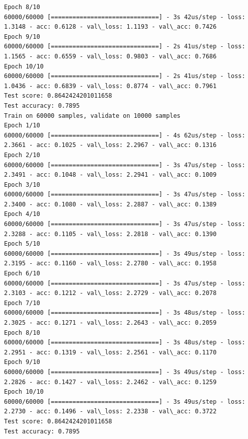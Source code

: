 \documentclass[11pt]{article}
\begin{document}
\begin{Verbatim}[commandchars=\\\{\}]
Epoch 8/10
60000/60000 [==============================] - 3s 42us/step - loss: 1.3148 - acc: 0.6128 - val\_loss: 1.1193 - val\_acc: 0.7426
Epoch 9/10
60000/60000 [==============================] - 2s 41us/step - loss: 1.1565 - acc: 0.6559 - val\_loss: 0.9803 - val\_acc: 0.7686
Epoch 10/10
60000/60000 [==============================] - 2s 41us/step - loss: 1.0436 - acc: 0.6839 - val\_loss: 0.8774 - val\_acc: 0.7961
Test score: 0.8642424201011658
Test accuracy: 0.7895
Train on 60000 samples, validate on 10000 samples
Epoch 1/10
60000/60000 [==============================] - 4s 62us/step - loss: 2.3661 - acc: 0.1025 - val\_loss: 2.2967 - val\_acc: 0.1316
Epoch 2/10
60000/60000 [==============================] - 3s 47us/step - loss: 2.3491 - acc: 0.1048 - val\_loss: 2.2941 - val\_acc: 0.1009
Epoch 3/10
60000/60000 [==============================] - 3s 47us/step - loss: 2.3400 - acc: 0.1080 - val\_loss: 2.2887 - val\_acc: 0.1389
Epoch 4/10
60000/60000 [==============================] - 3s 47us/step - loss: 2.3288 - acc: 0.1105 - val\_loss: 2.2818 - val\_acc: 0.1390
Epoch 5/10
60000/60000 [==============================] - 3s 49us/step - loss: 2.3195 - acc: 0.1160 - val\_loss: 2.2780 - val\_acc: 0.1958
Epoch 6/10
60000/60000 [==============================] - 3s 47us/step - loss: 2.3103 - acc: 0.1212 - val\_loss: 2.2729 - val\_acc: 0.2078
Epoch 7/10
60000/60000 [==============================] - 3s 48us/step - loss: 2.3025 - acc: 0.1271 - val\_loss: 2.2643 - val\_acc: 0.2059
Epoch 8/10
60000/60000 [==============================] - 3s 48us/step - loss: 2.2951 - acc: 0.1319 - val\_loss: 2.2561 - val\_acc: 0.1170
Epoch 9/10
60000/60000 [==============================] - 3s 49us/step - loss: 2.2826 - acc: 0.1427 - val\_loss: 2.2462 - val\_acc: 0.1259
Epoch 10/10
60000/60000 [==============================] - 3s 49us/step - loss: 2.2730 - acc: 0.1496 - val\_loss: 2.2338 - val\_acc: 0.3722
Test score: 0.8642424201011658
Test accuracy: 0.7895

    \end{Verbatim}
\end{document}
